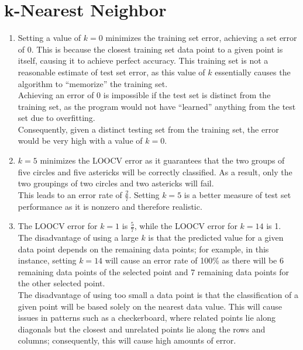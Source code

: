 \documentclass[11pt]{article}
\newcommand{\solution}[1]{{{\color{blue}{\bf Solution:} {#1}}}}
\begin{document}
\section{k-Nearest Neighbor}
\begin{enumerate}
\item
\solution{Setting a value of $k=0$ minimizes the training set error, achieving a set error of 0. This is because the closest training set data point to a given point is itself, causing it to achieve perfect accuracy. This training set is not a reasonable estimate of test set error, as this value of $k$ essentially causes the algorithm to ``memorize'' the training set. \\
Achieving an error of 0 is impossible if the test set is distinct from the training set, as the program would not have ``learned'' anything from the test set due to overfitting. \\
Consequently, given a distinct testing set from the training set, the error would be very high with a value of $k=0$.
}
\vspace{1cm}

\item
\solution{ $k=5$ minimizes the LOOCV error as it guarantees that the two groups of five circles and five astericks will be correctly classified. As a result, only the two groupings of two circles and two astericks will fail. \\
This leads to an error rate of $\tfrac{2}{7}$. Setting $k=5$ is a better measure of test set performance as it is nonzero and therefore realistic.
}
\vspace{1cm}

\item
\solution{The LOOCV error for $k=1$ is $\frac{5}{7}$, while the LOOCV error for $k=14$ is 1. \\
The disadvantage of using a large $k$ is that the predicted value for a given data point depends on the remaining data points; for example, in this instance, setting $k=14$ will cause an error rate of 100\% as there will be 6 remaining data points of the selected point and 7 remaining data points for the other selected point.\\
 The disadvantage of using too small a data point is that the classification of a given point will be based solely on the nearest data value. This will cause issues in patterns such as a checkerboard, where related points lie along diagonals but the closest and unrelated points lie along the rows and columns; consequently, this will cause high amounts of error.
}
\end{enumerate}
\newpage
\end{document}
